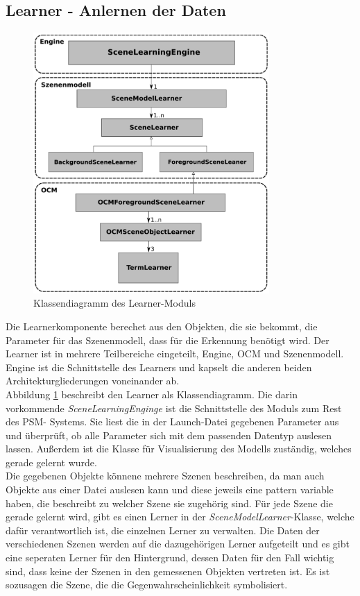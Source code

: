 \subsection{Learner - Anlernen der Daten}
\begin{figure}
	\centering
	\includegraphics[width=9cm]{bilder/LearnerClass.pdf}
	\caption{Klassendiagramm des Learner-Moduls \cite{gehrung14}}
	\label{img:learnerclass}
\end{figure}
Die Learnerkomponente berechet aus den Objekten, die sie bekommt, die Parameter für das Szenenmodell, dass für die Erkennung benötigt wird. Der Learner ist in mehrere Teilbereiche eingeteilt, Engine, OCM und Szenenmodell. Engine ist die Schnittstelle des Learners und kapselt die anderen beiden Architekturgliederungen voneinander ab.\smallskip\\
Abbildung \ref{img:learnerclass} beschreibt den Learner als Klassendiagramm. Die darin vorkommende \textit{SceneLearningEnginge} ist die Schnittstelle des Moduls zum Rest des PSM- Systems. Sie liest die in der Launch-Datei gegebenen Parameter aus und überprüft, ob alle Parameter sich mit dem passenden Datentyp auslesen lassen. Außerdem ist die Klasse für Visualisierung des Modells zuständig, welches gerade gelernt wurde. \smallskip\\
Die gegebenen Objekte könnene mehrere Szenen beschreiben, da man auch Objekte aus einer Datei auslesen kann und diese jeweils eine pattern variable haben, die beschreibt zu welcher Szene sie zugehörig sind. Für jede Szene die gerade gelernt wird, gibt es einen Lerner in der \textit{SceneModelLearner}-Klasse, welche dafür verantwortlich ist, die einzelnen Lerner zu verwalten. Die Daten der verschiedenen Szenen werden auf die dazugehörigen Lerner aufgeteilt und es gibt eine seperaten Lerner für den Hintergrund, dessen Daten für den Fall wichtig sind, dass keine der Szenen in den gemessenen Objekten vertreten ist. Es ist sozusagen die Szene, die die Gegenwahrscheinlichkeit symbolisiert.\smallskip\\
